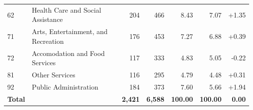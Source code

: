 \begin{table}[ht]
\begin{tabular}{llrrrrr}
62 & Health Care and Social Assistance & 204 & 466 & 8.43 & 7.07 & +1.35 \\
71 & Arts, Entertainment, and Recreation & 176 & 453 & 7.27 & 6.88 & +0.39 \\
72 & Accomodation and Food Services & 117 & 333 & 4.83 & 5.05 & -0.22 \\
81 & Other Services & 116 & 295 & 4.79 & 4.48 & +0.31 \\
92 & Public Administration & 184 & 373 & 7.60 & 5.66 & +1.94 \\
\midrule
\textbf{Total} & & \textbf{2,421} & \textbf{6,588} & \textbf{100.00} & \textbf{100.00} & \textbf{0.00} \\
\bottomrule
\end{tabular}
\end{table}
